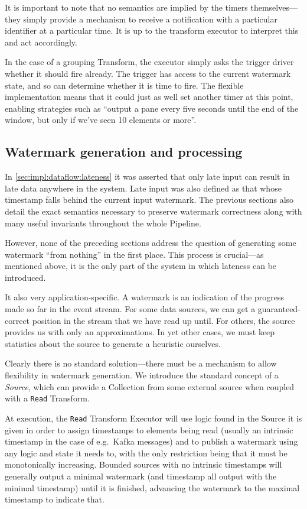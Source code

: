 It is important to note that no semantics are implied by the timers themselves---they simply provide a mechanism to receive a notification with a particular identifier at a particular time.
It is up to the transform executor to interpret this and act accordingly.

In the case of a grouping Transform, the executor simply asks the trigger driver whether it should fire already.
The trigger has access to the current watermark state, and so can determine whether it is time to fire.
The flexible implementation means that it could just as well set another timer at this point, enabling strategies such as ``output a pane every five seconds until the end of the window, but only if we've seen 10 elements or more''.

\subsection{Watermark generation and processing}


In \cref{sec:impl:dataflow:lateness} it was asserted that only late input can result in late data anywhere in the system.
Late input was also defined as that whose timestamp falls behind the current input watermark.
The previous sections also detail the exact semantics necessary to preserve watermark correctness along with many useful invariants throughout the whole Pipeline.

However, none of the preceding sections address the question of generating some watermark ``from nothing'' in the first place.
This process is crucial---as mentioned above, it is the only part of the system in which lateness can be introduced.

It also very application-specific.
A watermark is an indication of the progress made so far in the event stream.
For some data sources, we can get a guaranteed-correct position in the stream that we have read up until.
For others, the source provides us with only an approximations.
In yet other cases, we must keep statistics about the source to generate a heuristic ourselves.

Clearly there is no standard solution---there must be a mechanism to allow flexibility in watermark generation.
We introduce the standard concept of a \emph{Source}, which can provide a Collection from some external source when coupled with a \verb|Read| Transform.

At execution, the \verb|Read| Transform Executor will use logic found in the Source it is given in order to assign timestamps to elements being read (usually an intrinsic timestamp in the case of e.g.\ Kafka messages) and to publish a watermark using any logic and state it needs to, with the only restriction being that it must be monotonically increasing.
Bounded sources with no intrinsic timestamps will generally output a minimal watermark (and timestamp all output with the minimal timestamp) until it is finished, advancing the watermark to the maximal timestamp to indicate that.

